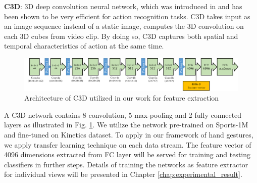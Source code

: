     \textbf{C3D}: 3D deep convolution neural network, which was introduced in \cite{tran2015learning} and has been shown to be very efficient for action recognition tasks. C3D takes input as an image sequence instead of a static image, computes the 3D convolution on each 3D cubes from video clip. By doing so, C3D captures both spatial and temporal characteristics of action at the same time.
    \begin{figure}[htbp]
        \centering
        \includegraphics[width=1\linewidth]{Figs/C3D.png}
        \caption{Architecture of C3D utilized in our work for feature extraction}
        \label{fig:C3D}
    \end{figure}
    A C3D network contains 8 convolution, 5 max-pooling and 2 fully connected layers as illustrated in Fig. \ref{fig:C3D}. 
    We utilize the network pre-trained on Sports-1M and fine-tuned on Kinetics dataset.
    To apply in our framework of hand gestures, we apply transfer learning technique on each data stream.
    The feature vector of 4096 dimensions extracted from FC layer will be served for training and testing classifiers in further steps.
    Details of training the networks as feature extractor for individual views will be presented in Chapter \ref{chap:experimental_result}.
